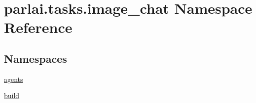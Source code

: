 \hypertarget{namespaceparlai_1_1tasks_1_1image__chat}{}\section{parlai.\+tasks.\+image\+\_\+chat Namespace Reference}
\label{namespaceparlai_1_1tasks_1_1image__chat}
\subsection*{Namespaces}
\begin{DoxyCompactItemize}
\item 
 \hyperlink{namespaceparlai_1_1tasks_1_1image__chat_1_1agents}{agents}
\item 
 \hyperlink{namespaceparlai_1_1tasks_1_1image__chat_1_1build}{build}
\end{DoxyCompactItemize}
